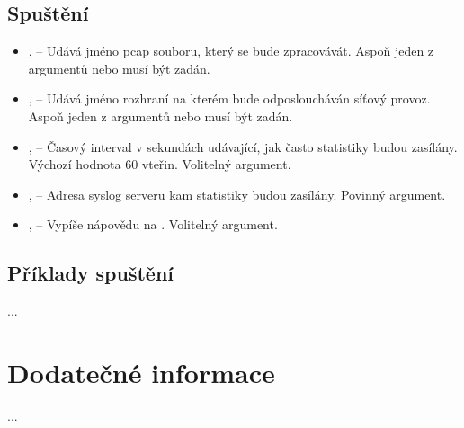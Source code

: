 \documentclass[11pt, a4paper, titlepage]{article}
\begin{document}
\subsection{Spuštění}


\begin{itemize}
	\item {},  -- Udává jméno pcap souboru, který se bude zpracovávát. Aspoň jeden z argumentů  nebo  musí být zadán.

	\item {},  -- Udává jméno rozhraní na kterém bude odposloucháván síťový provoz. Aspoň jeden z argumentů  nebo  musí být zadán.

	\item {},  -- Časový interval v sekundách udávající, jak často statistiky budou zasílány. Výchozí hodnota 60 vteřin. Volitelný argument.

	\item {},  -- Adresa syslog serveru kam statistiky budou zasílány. Povinný argument.

	\item {},  -- Vypíše nápovědu na . Volitelný argument.
\end{itemize}
\smallskip



\subsection{Příklady spuštění}

...

\newpage


\section{Dodatečné informace}

...

\newpage

\end{document}
